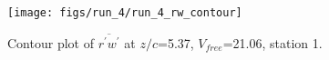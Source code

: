 \begin{figure}[H]
\centering
\texttt{[image: figs/run\_4/run\_4\_rw\_contour]}
\caption{Contour plot of $\overline{r^\prime w^\prime}$ at $z/c$=5.37, $V_{free}$=21.06, station 1.}
\label{fig:run_4_rw_contour}
\end{figure}


